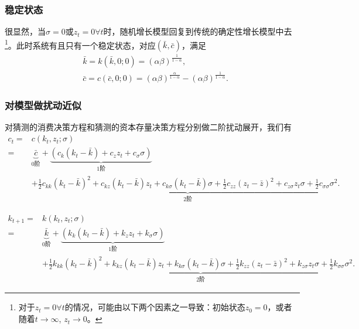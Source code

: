 \subsubsection{稳定状态}
很显然，当$\sigma = 0$或$z_t=0 \forall t$时，随机增长模型回复到传统的确定性增长模型中去\footnote{对于$z_t = 0 \forall t$的情况，可能由以下两个因素之一导致：初始状态$z_0 = 0$，或者随着$t \rightarrow \infty$, $z_t \rightarrow 0$。}。此时系统有且只有一个稳定状态，对应$(\bar{k},\bar{c})$，满足
\begin{equation}
  \label{eq:pta-ncgt-steady-state}
  \begin{split}
    &\bar{k} = k(\bar{k},0;0)=\left( \alpha \beta \right)^{\frac{1}{1-\alpha}},\\
    &\bar{c} = c(\bar{c},0;0) = \left( \alpha \beta \right)^{\frac{\alpha}{1-\alpha}} - \left( \alpha \beta \right)^{\frac{1}{1-\alpha}}.
  \end{split}
\end{equation}

\subsubsection{对模型做扰动近似}
对猜测的消费决策方程和猜测的资本存量决策方程分别做二阶扰动展开，我们有
\begin{equation}
  \label{eq:pta-ncgt-gdr-c}
\begin{split}
    c_t =& c(k_t,z_t;\sigma) \\
    =& \underbrace{\bar{c}}_{\text{0阶}}
    + \underbrace{\left(c_k(k_t - \bar{k}) + c_z z_t + c_{\sigma} \sigma\right)}_{\text{1阶}} \\
    &    + \underbrace{\frac{1}{2} c_{kk} \left(k_t-\bar{k}\right)^2 + c_{kz}(k_t - \bar{k})z_t + c_{k \sigma}(k_t - \bar{k})\sigma + \frac{1}{2}c_{zz}\left(z_t - \bar{z}\right)^2 + c_{z \sigma} z_t \sigma + \frac{1}{2}c_{\sigma \sigma}\sigma^2}_{{\text{2阶}}}.
\end{split}
\end{equation}

\begin{equation}
  \label{eq:pta-ncgt-gdr-k}
\begin{split}
    k_{t+1} =& k(k_t,z_t;\sigma) \\
    =& \underbrace{\bar{k}}_{\text{0阶}}
    + \underbrace{\left(k_k(k_t - \bar{k}) + k_z z_t + k_{\sigma} \sigma\right)}_{\text{1阶}} \\
    &    + \underbrace{\frac{1}{2} k_{kk} \left(k_t-\bar{k}\right)^2 + k_{kz}(k_t - \bar{k})z_t + k_{k \sigma}(k_t - \bar{k})\sigma + \frac{1}{2}k_{zz}\left(z_t - \bar{z}\right)^2 + k_{z \sigma} z_t \sigma + \frac{1}{2}k_{\sigma \sigma}\sigma^2}_{{\text{2阶}}}.
\end{split}
\end{equation}

